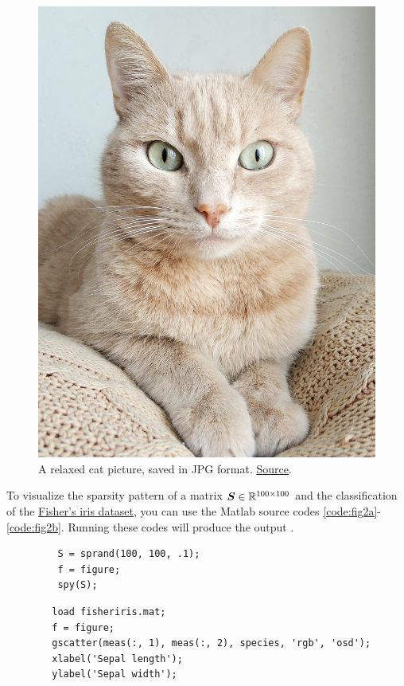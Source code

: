 	\begin{figure}[H]
		\centering
		\includegraphics[width=.5\textwidth]{fig/nice-cat.jpg}
		\caption{
			A relaxed cat picture, saved in JPG format. \href{https://www.pexels.com/photo/orange-tabby-cat-on-brown-knitted-textile-982300/}{Source}.
			\label{fig:cool-images}
			}
	\end{figure}
	
	To visualize the sparsity pattern of a matrix \(\mat{S}\in\mathbb{R}^{100\times 100}\) and the classification of the \href{https://en.wikipedia.org/wiki/Iris_flower_data_set}{Fisher's iris dataset}, you can use the Matlab source codes \ref{code:fig2a}-\ref{code:fig2b}. Running these codes will produce the output .
	
	\begin{lstlisting}[style=Matlab-editor, caption={Matlab code for \reffig{fig:sparsity}}, label=code:fig2a]
		% Source code for Figure 2a
		 S = sprand(100, 100, .1);
		 f = figure; 
		 spy(S);
	\end{lstlisting}
		
	\begin{lstlisting}[style=Matlab-editor, caption={Matlab code for \reffig{fig:classification}}, label=code:fig2b]
		% Source code for Figure 2b
		load fisheriris.mat; 
		f = figure;
		gscatter(meas(:, 1), meas(:, 2), species, 'rgb', 'osd');
		xlabel('Sepal length');
		ylabel('Sepal width');
	\end{lstlisting}
	

